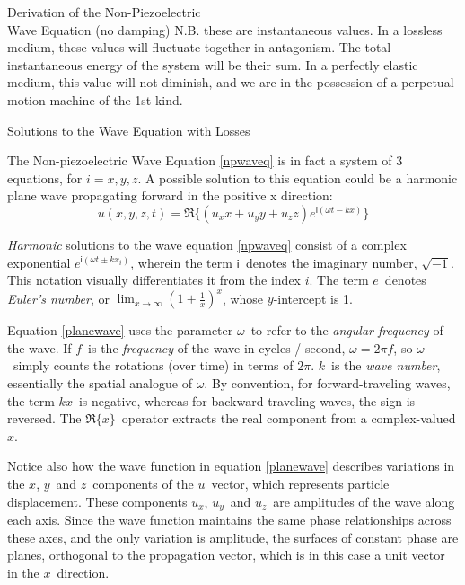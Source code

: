 \documentclass[a4paper,10pt]{report}
\numberwithin{equation}{section}
\begin{document}
{\begin{chapter}
\begin{section}{Derivation of the Non-Piezoelectric \\Wave Equation (no damping)}
N.B. these are instantaneous values. In a lossless medium, these values will fluctuate together in antagonism. The total instantaneous energy of the system will be their sum. In a perfectly elastic medium, this value will not diminish, and we are in the possession of a perpetual motion machine of the 1st kind.
\end{section}
\par
\begin{section}{Solutions to the Wave Equation with Losses}
\par
The Non-piezoelectric Wave Equation \eqref{npwaveq} is in fact a system of 3 equations, for $i = x, y, z$. 
A possible solution to this equation could be a harmonic plane wave propagating forward in the positive x direction\cite[p.~12]{Ballantine1997}:
\begin{equation}
u(x,y,z,t) = \Re\{(u_x x + u_y y + u_z z) e^{\mathsf{i}(\omega t - k x)}\}
\end{equation}
\par
\emph{Harmonic} solutions to the wave equation \eqref{npwaveq} consist of a complex exponential $e^{\mathsf{i}(\omega t \pm k x_i)}$, wherein the term $\mathsf{i}$\  denotes the imaginary number, $\sqrt{-1}$. This notation visually differentiates it from the index $i$. The term $e$\  denotes \emph{Euler's number}, or $\lim_{x \to \infty} (1 + \frac{1}{x})^x$, whose $y$-intercept is 1. 
\par
Equation \eqref{planewave} uses the parameter $\omega$\  to refer to the \emph{angular frequency} of the wave. If $f$\  is the \emph{frequency} of the wave in cycles / second, $\omega = 2\pi f$, so $\omega$\  simply counts the rotations (over time) in terms of $2\pi$. $k$\  is the \emph{wave number}, essentially the spatial analogue of $\omega$. By convention, for forward-traveling waves, the term $kx$\  is negative, whereas for backward-traveling waves, the sign is reversed. The $\Re\{x\}$\  operator extracts the real component from a complex-valued $x$. \cite{Ballantine1997, Kino1987, Cremer1973} 
\par
Notice also how the wave function in equation \eqref{planewave} describes variations in the $x$, $y$\  and $z$\  components of the $u$\  vector, which represents particle displacement. These components $u_x$, $u_y$\  and $u_z$\  are amplitudes of the wave along each axis. Since the wave function maintains the same phase relationships across these axes, and the only variation is amplitude, the surfaces of constant phase are planes, orthogonal to the propagation vector, which is in this case a unit vector in the $x$\  direction. 

\end{section}
\end{chapter}}
\end{document}
